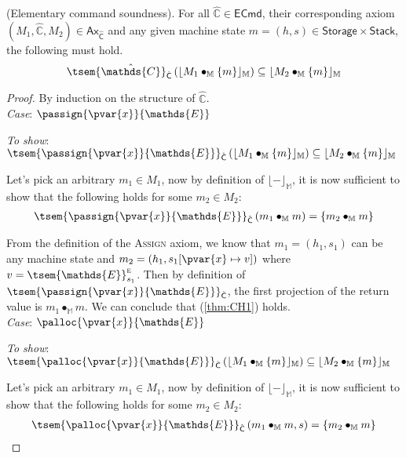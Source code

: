 \thm \label{thm:eSound} (Elementary command soundness). For all $\hat{\mathds{C}} \in \mathsf{ECmd}$, their corresponding axiom $(M_1, \hat{\mathds{C}}, M_2) \in \mathsf{Ax}_{\hat{\mathsf{C}}}$ and any given machine state $m = (h, s) \in \mathsf{Storage} \times \mathsf{Stack}$, the following must hold.
\[
	\tsem{\hat{\mathds{C}}}_{\hat{\mathsf{C}}} \left( \lfloor M_1 \bullet_\mathbb{M} \{m\} \rfloor_\mathbb{M} \right) \subseteq \lfloor M_2 \bullet_\mathbb{M} \{m\} \rfloor_\mathbb{M}
\]
{\parindent0pt
\begin{proof}
By induction on the structure of $\hat{\mathds{C}}$. \\

\textit{Case}: $\passign{\pvar{x}}{\mathds{E}}$

\textit{To show}: $\tsem{\passign{\pvar{x}}{\mathds{E}}}_{\hat{\mathsf{C}}} \left( \lfloor M_1 \bullet_\mathbb{M} \{m\} \rfloor_\mathbb{M} \right) \subseteq \lfloor M_2 \bullet_\mathbb{M} \{m\} \rfloor_\mathbb{M}$

Let's pick an arbitrary $m_1 \in M_1$, now by definition of $\lfloor - \rfloor_\mathbb{M}$, it is now sufficient to show that the following holds for some $m_2 \in M_2$:
\begin{gather}
	\label{thm:CH1} \tsem{\passign{\pvar{x}}{\mathds{E}}}_{\hat{\mathsf{C}}} \left(m_1 \bullet_\mathbb{M} m \right) = \{ m_2 \bullet_\mathbb{M} m \}
\end{gather}

From the definition of the \textsc{Assign} axiom, we know that $m_1 = (h_1, s_1)$ can be any machine state and $m_2 = (h_1, s_1[\pvar{x} \mapsto v])$ where $v = \tsem{\mathds{E}}^\textsc{e}_{s_1}$. Then by definition of $\tsem{\passign{\pvar{x}}{\mathds{E}}}_{\hat{\mathsf{C}}}$, the first projection of the return value is $m_1 \bullet_\mathbb{M} m$. We can conclude that (\ref{thm:CH1}) holds.  \\

\textit{Case}: $\palloc{\pvar{x}}{\mathds{E}}$

\textit{To show}: $\tsem{\palloc{\pvar{x}}{\mathds{E}}}_{\hat{\mathsf{C}}} \left( \lfloor M_1 \bullet_\mathbb{M} \{m\} \rfloor_\mathbb{M} \right) \subseteq \lfloor M_2 \bullet_\mathbb{M} \{m\} \rfloor_\mathbb{M}$

Let's pick an arbitrary $m_1 \in M_1$, now by definition of $\lfloor - \rfloor_\mathbb{M}$, it is now sufficient to show that the following holds for some $m_2 \in M_2$:
\begin{gather}
	\label{thm:CH3} \tsem{\palloc{\pvar{x}}{\mathds{E}}}_{\hat{\mathsf{C}}} \left(m_1 \bullet_\mathbb{M} m, s \right) = \{ m_2 \bullet_\mathbb{M} m \}
\end{gather}


\end{proof}}
